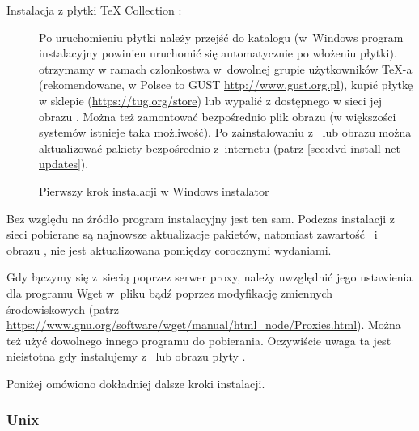\documentclass{article}
\begin{document}
\begin{description}

%


\item [Instalacja z płytki \TeX{} Collection \DVD:] Po uruchomieniu
płytki należy przejść do katalogu    \DVD{}
(w~Windows program instalacyjny powinien uruchomić się  automatycznie po włożeniu płytki).
\DVD{} otrzymamy w ramach członkostwa w~dowolnej grupie użytkowników
  \TeX-a (rekomendowane, w Polsce to GUST  \url{http://www.gust.org.pl}), kupić płytkę w sklepie
(\url{https://tug.org/store})
 lub  wypalić  z dostępnego w sieci jej obrazu \ISO{}. Można też zamontować
bezpośrednio plik obrazu (w większości systemów istnieje taka możliwość). Po
zainstalowaniu z \DVD\ lub obrazu \ISO{} można aktualizować pakiety
bezpośrednio z~internetu (patrz \ref{sec:dvd-install-net-updates}).
\end{description}

\begin{figure}[tb]
\caption{Pierwszy krok instalacji  w Windows instalator }\label{fig:nsis}
\end{figure}

Bez względu na źródło   program instalacyjny jest ten sam.
Podczas instalacji z sieci pobierane są najnowsze aktualizacje pakietów, natomiast zawartość
 \DVD\ i obrazu \ISO, nie jest
aktualizowana pomiędzy  corocznymi wydaniami.

Gdy łączymy się  z~siecią poprzez serwer proxy, należy uwzględnić
jego ustawienia  dla programu Wget
w~pliku  bądź poprzez modyfikację zmiennych środowiskowych
(patrz \url{https://www.gnu.org/software/wget/manual/html_node/Proxies.html}). Można też użyć   dowolnego innego   programu do pobierania.
Oczywiście uwaga ta jest nieistotna
gdy instalujemy z \DVD\ lub obrazu płyty \ISO.


\noindent Poniżej omówiono dokładniej dalsze kroki instalacji.
\subsubsection{Unix}
\end{document}
